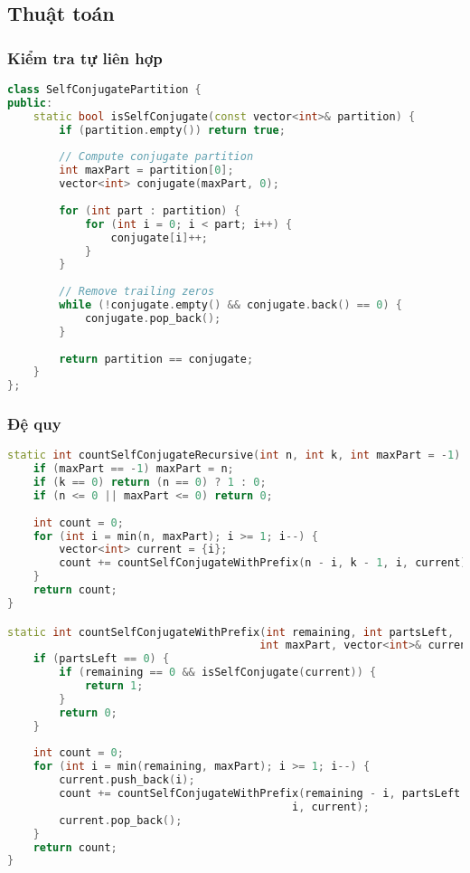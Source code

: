 \documentclass[12pt,a4paper]{article}
\theoremstyle{definition}
\begin{document}
\subsection{Thuật toán}

\subsubsection{Kiểm tra tự liên hợp}

\begin{lstlisting}[language=C++, caption=Kiểm tra phân hoạch tự liên hợp]
class SelfConjugatePartition {
public:
    static bool isSelfConjugate(const vector<int>& partition) {
        if (partition.empty()) return true;
        
        // Compute conjugate partition
        int maxPart = partition[0];
        vector<int> conjugate(maxPart, 0);
        
        for (int part : partition) {
            for (int i = 0; i < part; i++) {
                conjugate[i]++;
            }
        }
        
        // Remove trailing zeros
        while (!conjugate.empty() && conjugate.back() == 0) {
            conjugate.pop_back();
        }
        
        return partition == conjugate;
    }
};
\end{lstlisting}

\subsubsection{Đệ quy}

\begin{lstlisting}[language=C++, caption=Đếm phân hoạch tự liên hợp - Đệ quy]
static int countSelfConjugateRecursive(int n, int k, int maxPart = -1) {
    if (maxPart == -1) maxPart = n;
    if (k == 0) return (n == 0) ? 1 : 0;
    if (n <= 0 || maxPart <= 0) return 0;
    
    int count = 0;
    for (int i = min(n, maxPart); i >= 1; i--) {
        vector<int> current = {i};
        count += countSelfConjugateWithPrefix(n - i, k - 1, i, current);
    }
    return count;
}

static int countSelfConjugateWithPrefix(int remaining, int partsLeft, 
                                       int maxPart, vector<int>& current) {
    if (partsLeft == 0) {
        if (remaining == 0 && isSelfConjugate(current)) {
            return 1;
        }
        return 0;
    }
    
    int count = 0;
    for (int i = min(remaining, maxPart); i >= 1; i--) {
        current.push_back(i);
        count += countSelfConjugateWithPrefix(remaining - i, partsLeft - 1, 
                                            i, current);
        current.pop_back();
    }
    return count;
}
\end{lstlisting}
\end{document}

